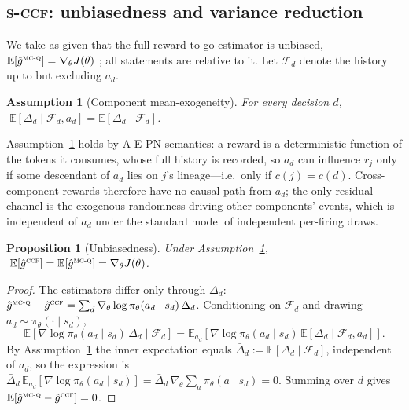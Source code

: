 \documentclass[review,authoryear,3p,times]{elsarticle}
\newtheorem{proposition}{Proposition}
\newtheorem{assumption}{Assumption}
\newcommand{\ccf}{\textsc{ccf}}
\newcommand{\sccf}{\textsc{s-ccf}}
\newcommand{\mcq}{\textsc{mc-q}}
\newcommand{\Fscr}{\mathcal{F}}
\newcommand{\Ex}{\mathbb{E}}
\begin{document}
\subsection{\sccf: unbiasedness and variance reduction}
\label{sec:theory:sccf}

We take as given that the full reward-to-go estimator is unbiased,
$\Ex[\hat g^{\mcq}]=\nabla_\theta J(\theta)$ \citep{sutton2000pg}; all statements
are relative to it. Let $\Fscr_d$ denote the history up to but excluding $a_d$.

\begin{assumption}[Component mean-exogeneity]\label{ass:a1}
For every decision $d$, $\;\Ex[\Delta_d\mid \Fscr_d, a_d] = \Ex[\Delta_d\mid \Fscr_d]$.
\end{assumption}

Assumption~\ref{ass:a1} holds by A-E PN semantics: a reward is a deterministic
function of the tokens it consumes, whose full history is recorded, so $a_d$ can
influence $r_j$ only if some descendant of $a_d$ lies on $j$'s lineage---i.e.\
only if $c(j)=c(d)$. Cross-component rewards therefore have no causal path from
$a_d$; the only residual channel is the exogenous randomness driving other
components' events, which is independent of $a_d$ under the standard model of
independent per-firing draws.

\begin{proposition}[Unbiasedness]\label{prop:unbiased}
Under Assumption~\ref{ass:a1}, $\;\Ex[\hat g^{\ccf}]=\Ex[\hat g^{\mcq}]=\nabla_\theta J(\theta)$.
\end{proposition}
\begin{proof}
The estimators differ only through $\Delta_d$:
$\hat g^{\mcq}-\hat g^{\ccf}=\sum_d \nabla_\theta\log\pi_\theta(a_d\mid s_d)\,\Delta_d$.
Conditioning on $\Fscr_d$ and drawing $a_d\sim\pi_\theta(\cdot\mid s_d)$,
\[
\Ex\!\left[\nabla\log\pi_\theta(a_d\mid s_d)\,\Delta_d \mid \Fscr_d\right]
=\Ex_{a_d}\!\left[\nabla\log\pi_\theta(a_d\mid s_d)\,\Ex[\Delta_d\mid \Fscr_d,a_d]\right].
\]
By Assumption~\ref{ass:a1} the inner expectation equals
$\bar\Delta_d:=\Ex[\Delta_d\mid\Fscr_d]$, independent of $a_d$, so the expression
is $\bar\Delta_d\,\Ex_{a_d}[\nabla\log\pi_\theta(a_d\mid s_d)]=\bar\Delta_d\,\nabla_\theta\!\sum_a\pi_\theta(a\mid s_d)=0$.
Summing over $d$ gives $\Ex[\hat g^{\mcq}-\hat g^{\ccf}]=0$.
\end{proof}
\end{document}
